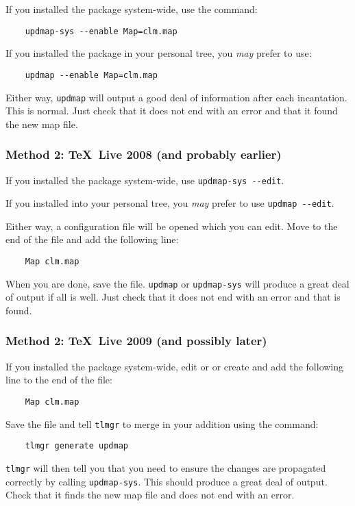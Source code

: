\documentclass[11pt,british]{article}
\begin{document}
If you installed the package system-wide, use the command:
\begin{verbatim}
	updmap-sys --enable Map=clm.map
\end{verbatim}
If you installed the package in your personal tree, you \emph{may} prefer to use:
\begin{verbatim}
	updmap --enable Map=clm.map
\end{verbatim}

Either way, \verb|updmap| will output a good deal of information after each incantation. This is normal. Just check that it does not end with an error and that it found the new map file.

\subsubsection{Method 2: \TeX~Live 2008 (and probably earlier)}

If you installed the package system-wide, use \verb|updmap-sys --edit|.

If you installed into your personal tree, you \emph{may} prefer to use	\verb|updmap --edit|.

Either way, a configuration file will be opened which you can edit. Move to the end of the file and add the following line:
\begin{verbatim}
	Map clm.map
\end{verbatim}
When you are done, save the file. \verb|updmap| or \verb|updmap-sys| will produce a great deal of output if all is well. Just check that it does not end with an error and that  is found.

\subsubsection{Method 2: \TeX~Live 2009 (and possibly later)}

If you installed the package system-wide, edit or or create  and add the following line to the end of the file:
\begin{verbatim}
	Map clm.map
\end{verbatim}
Save the file and tell \verb|tlmgr| to merge in your addition using the command:
\begin{verbatim}
	tlmgr generate updmap
\end{verbatim}
\verb|tlmgr| will then tell you that you need to ensure the changes are propagated correctly by calling \verb|updmap-sys|. This should produce a great deal of output. Check that it finds the new map file and does not end with an error.
\end{document}
